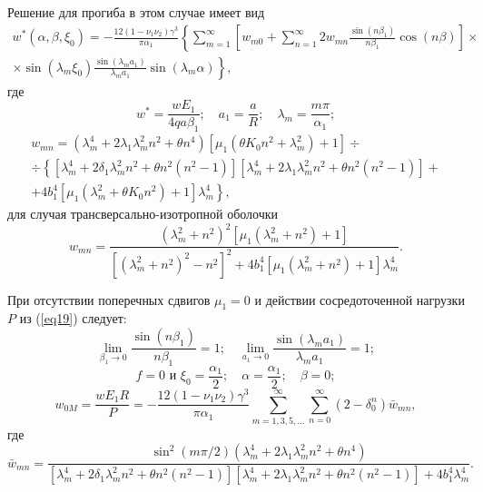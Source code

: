 \documentclass[press]{vestnik}
\begin{document}
Решение для прогиба в этом случае имеет вид
\begin{multline}\label{eq19}
 w^{\ast }\left( {\alpha ,\beta ,\xi_{0} } \right)=-\frac{12\left( {1-\nu 
_{1} \nu_{2} } \right)\gamma^{3}}{\pi \alpha_{1} }\left\{ 
{\sum\limits_{m=1}^\infty {\left[ {w_{m0} +\sum\limits_{n=1}^\infty {2w_{mn} 
\frac{\sin \left( {n\beta_{1} } \right)}{n\beta_{1} }\cos \left( {n\beta } 
\right)} } \right]} } \right.\times \\ 
 \times \left. {\sin \left( {\lambda_{m} \xi_{0} } \right)\frac{\sin 
\left( {\lambda_{m} a_{1} } \right)}{\lambda_{m} a_{1} }\sin \left( 
{\lambda_{m} \alpha } \right)} \right\} , 
\end{multline}
где 
\[
w^{\ast }=\frac{wE_{1} }{4qa\beta_{1} };
\quad
a_{1} =\frac{a}{R};
\quad 
\lambda_{m} =\frac{m\pi }{\alpha_{1} };
\]
\begin{multline*}
w_{mn} =\left( {\lambda_{m}^{4} +2\lambda_{1} \lambda_{m}^{2} 
n^{2}+\theta n^{4}} \right)\left[ {\mu_{1} \left( {\theta K_{0} 
n^{2}+\lambda_{m}^{2} } \right)+1} \right]\div \\ 
 \div \left\{ {\left[ {\lambda_{m}^{4} +2\delta_{1} \lambda_{m}^{2} 
n^{2}+\theta n^{2}\left( {n^{2}-1} \right)} \right]} \right.\left[ {\lambda 
_{m}^{4} +2\lambda_{1} \lambda_{m}^{2} n^{2}+\theta n^{2}\left( {n^{2}-1} 
\right)} \right]+ \\ 
 +\left. {4b_{1}^{4} \left[ {\mu_{1} \left( {\lambda_{m}^{2} +\theta K_{0} 
n^{2}} \right)+1} \right]\lambda_{m}^{4} } \right\} , 
\end{multline*}
для случая трансверсально-изотропной оболочки
\[
w_{mn} =\frac{\left( {\lambda_{m}^{2} +n^{2}} \right)^{2}\left[ {\mu_{1} 
\left( {\lambda_{m}^{2} +n^{2}} \right)+1} \right]}{\left[ {\left( {\lambda 
_{m}^{2} +n^{2}} \right)^{2}-n^{2}} \right]^{2}+4b_{1}^{4} \left[ {\mu_{1} 
\left( {\lambda_{m}^{2} +n^{2}} \right)+1} \right]\lambda_{m}^{4} }.
\]

При отсутствии поперечных сдвигов $\mu_{1} =0$ и действии сосредоточенной 
нагрузки $P$ из (\ref{eq19}) следует:
\[
\lim\limits_{\beta_{1} \to 0} \frac{\sin \left( {n\beta_{1} } 
\right)}{n\beta_{1} }=1;
\quad
\lim\limits_{a_{1} \to 0} \frac{\sin \left( {\lambda_{m} a_{1} } 
\right)}{\lambda_{m} a_{1} }=1;
\]
\[
f=0\text{ и }\xi_{0} =\frac{\alpha_{1} }{2}; \quad \alpha =\frac{\alpha_{1} }{2};
\quad \beta =0;
\]
\begin{equation}
\label{eq20}
w_{0M} =\frac{wE_{1} R}{P}=-\frac{12\left( {1-\nu_{1} \nu_{2} } 
\right)\gamma^{3}}{\pi \alpha_{1} }\sum\limits_{m=1, 3, 5,\ldots}^\infty 
{\sum\limits_{n=0}^\infty {\left( {2-\delta_{0}^{n} } \right)\bar{{w}}_{mn} 
} } ,
\end{equation}
где 
\[
\bar{{w}}_{mn} =\frac{\sin^{2}\left( {m\pi/2} \right)\left( 
{\lambda_{m}^{4} +2\lambda_{1} \lambda_{m}^{2} n^{2}+\theta n^{4}} 
\right)}{\left[ {\lambda_{m}^{4} +2\delta_{1} \lambda_{m}^{2} 
n^{2}+\theta n^{2}\left( {n^{2}-1} \right)} \right]\left[ {\lambda_{m}^{4} 
+2\lambda_{1} \lambda_{m}^{2} n^{2}+\theta n^{2}\left( {n^{2}-1} \right)} 
\right]+4b_{1}^{4} \lambda_{m}^{4} }.
\]
\end{document}
